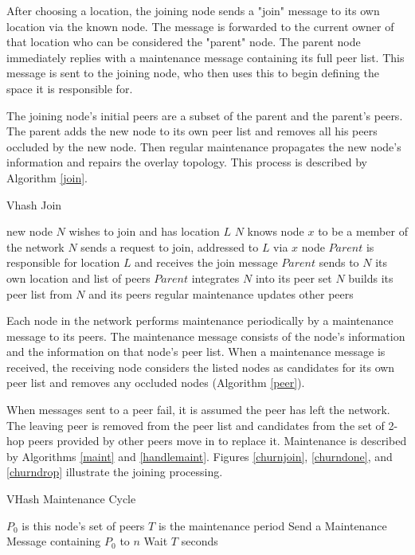 \documentclass[11pt]{IEEEtran} %
\begin{document}
After choosing a location, the joining node sends a "join" message to its own location via the known node.
The message is forwarded to the current owner of that location who can be considered the "parent" node.
The parent node immediately replies with a maintenance message containing its full peer list. This message is sent to the joining node, who then uses this to begin defining the space it is responsible for. 

The joining node's initial peers are a subset of the parent and the parent's peers. The parent adds the new node to its own peer list and removes all his peers occluded by the new node.  Then regular maintenance propagates the new node's information and repairs the overlay topology.  This process is described by Algorithm \ref{join}.

\begin{algorithm}
\caption{Vhash Join}
\label{join}
\begin{algorithmic}[1]  %
\STATE new node $N$ wishes to join and has location $L$
\STATE $N$ knows node $x$ to be a member of the network
\STATE $N$ sends a request to join, addressed to $L$ via $x$
\STATE node $Parent$ is responsible for location $L$ and receives the join message
\STATE $Parent$ sends to $N$ its own location and list of peers
\STATE $Parent$ integrates $N$ into its peer set
\STATE $N$ builds its peer list from $N$ and its peers
\STATE regular maintenance updates other peers
\end{algorithmic}
\end{algorithm}


Each node in the network performs maintenance periodically by a maintenance message to its peers. The maintenance message consists of the node's information and the information on that node's peer list. When a maintenance message is received, the receiving node considers the listed nodes as candidates for its own peer list and removes any occluded nodes (Algorithm \ref{peer}). 




When messages sent to a peer fail, it is assumed the peer has left the network. The leaving peer is removed from the peer list and candidates from the set of 2-hop peers provided by other peers move in to replace it.  Maintenance is described by Algorithms \ref{maint} and \ref{handlemaint}.  Figures \ref{churnjoin}, \ref{churndone}, and \ref{churndrop} illustrate the joining processing.

\begin{algorithm}
\caption{VHash Maintenance Cycle}
\label{maint}
\begin{algorithmic}[1]  %
	\STATE $P_0$ is this node's set of peers
    \STATE $T$ is the maintenance period
        	\STATE Send a Maintenance Message containing $P_0$ to $n$
        \ENDFOR
    \STATE Wait $T$ seconds
    \ENDWHILE
\end{algorithmic}
\end{algorithm}
\end{document}
